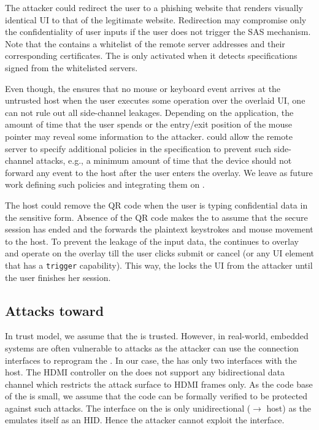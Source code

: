  The attacker could redirect the user to a phishing website that renders visually identical UI to that of the legitimate website. Redirection may compromise only the confidentiality of user inputs if the user does not trigger the SAS mechanism. Note that the \device contains a whitelist of the remote server addresses and their corresponding certificates. The \device is only activated when it detects specifications signed from the whitelisted servers.

 Even though, the \device ensures that no mouse or keyboard event arrives at the untrusted host when the user executes some operation over the overlaid UI, one can not rule out all side-channel leakages. Depending on the application, the amount of time that the user spends or the entry/exit position of the mouse pointer may reveal some information to the attacker. 
\device could allow the remote server to specify additional policies in the specification to prevent such side-channel attacks, e.g., a minimum amount of time that the device should not forward any event to the host after the user enters the overlay. We leave as future work defining such policies and integrating them on \name.

 The host could remove the QR code when the user is typing confidential data in the sensitive form. Absence of the QR code makes the \device to assume that the secure session has ended and the \device forwards the plaintext keystrokes and mouse movement to the host. To prevent the leakage of the input data, the \device continues to overlay and operate on the overlay till the user clicks submit or cancel (or any UI element that has a \texttt{trigger}  capability). This way, the \device locks the UI from the attacker until the user finishes her session.

\subsection{Attacks toward \device} 

In \name trust model, we assume that the \device is trusted. However, in real-world, embedded systems are often vulnerable to attacks as the attacker can use the connection interfaces to reprogram the \device. In our case, the \device has only two interfaces with the host. The HDMI controller on the \device does not support any bidirectional data channel which restricts the attack surface to HDMI frames only.
As the code base of the \device is small, we assume that the code can be formally verified to be protected against such attacks. The \usb interface on the \device is only unidirectional (\device $\rightarrow$ host) as the \device emulates itself as an HID. Hence the attacker cannot exploit the \usb interface.  

